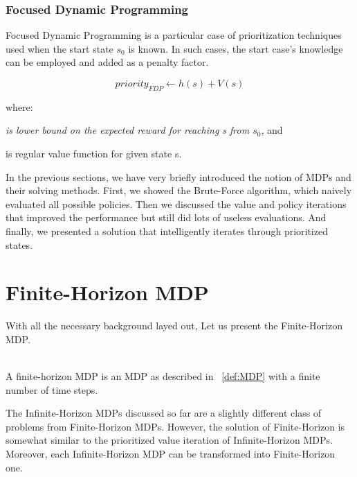 \subsubsection{Focused Dynamic Programming}

Focused Dynamic Programming is a particular case of prioritization techniques used when the start state $s_0$ is known. In such cases, the start case's knowledge can be employed and added as a penalty factor.


\begin{equation}priority_{FDP} \xleftarrow{} h(s) + V(s)\end{equation}


where:
\begin{description}[1cm]
  \item[h(s)] \textit{is lower bound on the expected reward for reaching s from $s_0$}, and
  \item[V(s)] is regular value function for given state s.
\end{description}

In the previous sections, we have very briefly introduced the notion of MDPs and their solving methods. First, we showed the Brute-Force algorithm, which naively evaluated all possible policies. Then we discussed the value and policy iterations that improved the performance but still did lots of useless evaluations. And finally, we presented a solution that intelligently iterates through prioritized states. 

\section{Finite-Horizon MDP} \label{FHMDP}

With all the necessary background layed out, Let us present the Finite-Horizon MDP.\\ \\

\begin{definition}
A finite-horizon MDP is an MDP as described in ~\ref{def:MDP} with a finite number of time steps. %
\end{definition}


The Infinite-Horizon MDPs discussed so far are a slightly different class of problems from Finite-Horizon MDPs. However, the solution of Finite-Horizon is somewhat similar to the prioritized value iteration of Infinite-Horizon MDPs. 
Moreover, each Infinite-Horizon MDP can be transformed into Finite-Horizon one.


